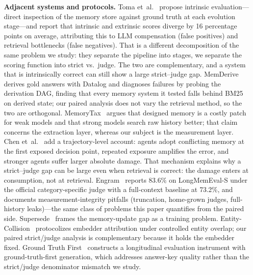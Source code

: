 \documentclass[10pt]{article}
\begin{document}
\textbf{Adjacent systems and protocols.} Toma et~al.~\citep{beyondqa} propose intrinsic
evaluation---direct inspection of the memory store against ground truth at each evolution
stage---and report that intrinsic and extrinsic scores diverge by 16 percentage points on average,
attributing this to LLM compensation (false positives) and retrieval bottlenecks (false negatives).
That is a different decomposition of the same problem we study: they separate the pipeline into
stages, we separate the scoring function into strict vs.\ judge. The two are complementary, and a
system that is intrinsically correct can still show a large strict--judge gap. MemDerive~\citep{memderive}
derives gold answers with Datalog and diagnoses failures by probing the derivation DAG, finding that
every memory system it tested falls behind BM25 on derived state; our paired analysis does not vary
the retrieval method, so the two are orthogonal. MemoryTax~\citep{memtax} argues that designed memory
is a costly patch for weak models and that strong models search raw history better; that claim
concerns the extraction layer, whereas our subject is the measurement layer. Chen et~al.~\citep{comptrap} add a trajectory-level account: agents adopt conflicting
memory at the first exposed decision point, repeated exposure amplifies the error, and stronger
agents suffer larger absolute damage. That mechanism explains why a strict--judge gap can be
large even when retrieval is correct: the damage enters at consumption, not at retrieval. Engram~\citep{engram} reports 83.6\% on
LongMemEval-S under the official category-specific judge with a full-context baseline at
73.2\%, and documents measurement-integrity pitfalls (truncation, home-grown judges,
full-history leaks)---the same class of problems this paper quantifies from the paired side.
Supersede~\citep{supersede} frames the memory-update gap as a training problem.
Entity-Collision~\citep{entitycollision} protocolizes embedder attribution under controlled
entity overlap; our paired strict/judge analysis is complementary because it holds the embedder
fixed. Ground Truth First~\citep{gtfirst} constructs a longitudinal evaluation instrument with
ground-truth-first generation, which addresses answer-key quality rather than the strict/judge
denominator mismatch we study.
\end{document}
